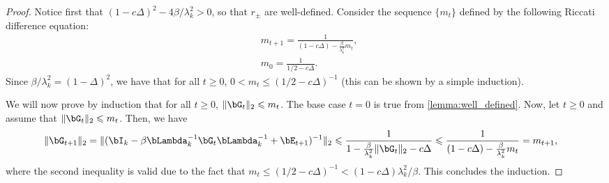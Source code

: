\documentclass{article}
\theoremstyle{plain}
\theoremstyle{definition}
\theoremstyle{remark}
\begin{document}
\begin{proof}
  Notice first that $(1-c\Delta)^2 - 4\beta/\lambda_k^2 > 0$, so that $r_\pm$ are well-defined. Consider the sequence $\{m_t\}$ defined by the following Riccati difference equation:
  \begin{align*}
    & m_{t+1} = \frac{1}{(1- c\Delta) - \frac{\beta}{\lambda_k^2} m_t}, \\
    & m_0  = \frac{1}{1/2 - c\Delta}.
  \end{align*}
  Since $\beta/\lambda_k^2 = (1-\Delta)^2$, we have that for all $t\geqslant 0$, $0 < m_t \leqslant (1/2 - c\Delta)^{-1}$ (this can be shown by a simple induction).

  We will now prove by induction that for all $t \geqslant 0$, $\Vert \bG_t \Vert_2 \leqslant m_t$. The base case $t=0$ is true from \cref{lemma:well_defined}. Now, let $t\geqslant 0$ and assume that $\Vert \bG_t \Vert_2 \leqslant m_t$. Then, we have
  \begin{align*}
    \Vert \bG_{t+1} \Vert_2 = \Vert (\bI_k - \beta\bLambda_k^{-1}\bG_t\bLambda_k^{-1} + \bE_{t+1})^{-1} \Vert_2& \leqslant \frac{1}{1 - \frac{\beta}{\lambda_k^2} \Vert \bG_t \Vert_2 - c\Delta} \leqslant \frac{1}{(1 - c\Delta) - \frac{\beta}{\lambda_k^2} m_t} = m_{t+1},
  \end{align*}
  where the second inequality is valid due to the fact that $m_t \leqslant  (1/2 - c\Delta)^{-1} < (1-c\Delta)\lambda_k^2/\beta$. This concludes the induction.


\end{proof}
\end{document}
